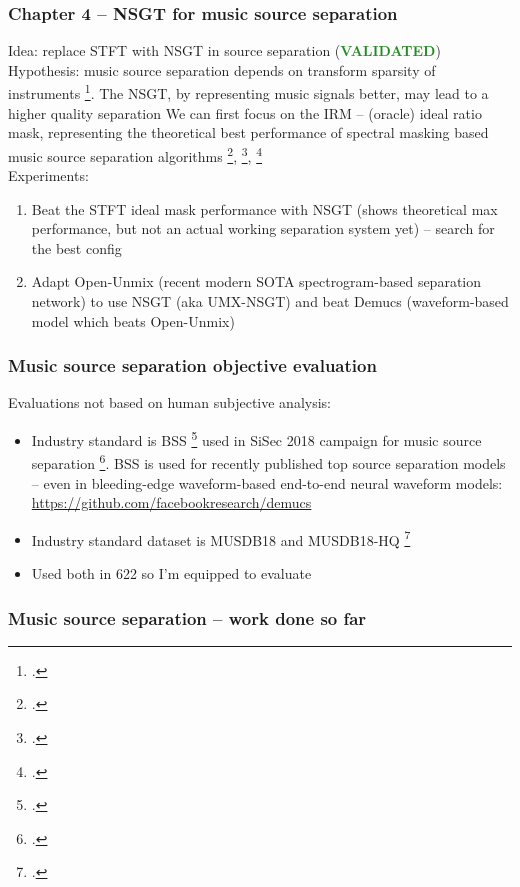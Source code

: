 \documentclass[usenames,dvipsnames]{beamer}
\begin{document}
\begin{frame}
	\frametitle{Chapter 4 -- NSGT for music source separation}
	Idea: replace STFT with NSGT in source separation (\textcolor{ForestGreen}{\textbf{VALIDATED}})\\
	Hypothesis: music source separation depends on transform sparsity of instruments \footcite{musicsepgood}. The NSGT, by representing music signals better, may lead to a higher quality separation
	\vspace{0.5em}
	We can first focus on the IRM -- (oracle) ideal ratio mask, representing the theoretical  best performance of spectral masking based music source separation algorithms \footcite{irm}, \footcite{sisec2018}, \footcite{vincent07}\\
	\vspace{0.5em}
	Experiments:
	\begin{enumerate}
		\item
			Beat the STFT ideal mask performance with NSGT (shows theoretical max performance, but not an actual working separation system yet) -- search for the best config
		\item
			Adapt Open-Unmix (recent modern SOTA spectrogram-based separation network) to use NSGT (aka UMX-NSGT) and beat Demucs (waveform-based model which beats Open-Unmix)
	\end{enumerate}
\end{frame}

\begin{frame}
	\frametitle{Music source separation objective evaluation}
	Evaluations not based on human subjective analysis:
	\begin{itemize}
		\item
			Industry standard is BSS \footcite{bss} used in SiSec 2018 campaign for music source separation \footcite{sisec2018}. BSS is used for recently published top source separation models -- even in bleeding-edge waveform-based end-to-end neural waveform models: \href{https://github.com/facebookresearch/demucs}{https://github.com/facebookresearch/demucs}
		\item
			Industry standard dataset is MUSDB18 and MUSDB18-HQ \footcite{musdb18, musdb18-hq}
		\item
			Used both in 622 so I'm equipped to evaluate
	\end{itemize}
\end{frame}

\begin{frame}
	\frametitle{Music source separation -- work done so far}
\end{frame}
\end{document}
